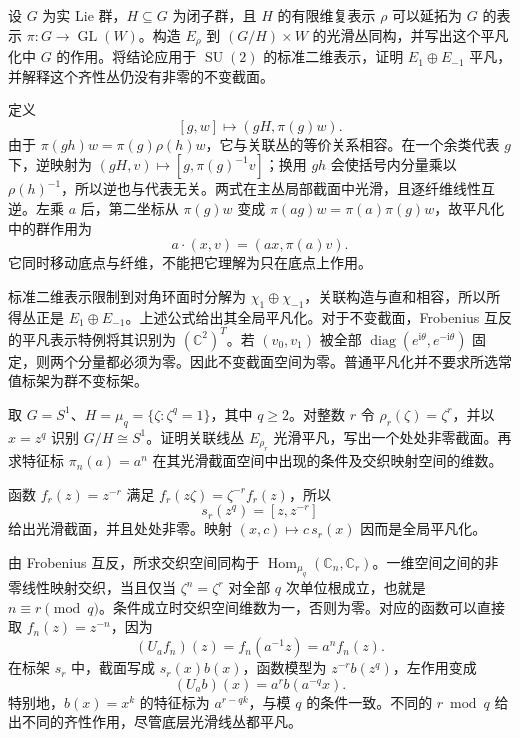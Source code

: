 \begin{exercise}\label{g1:ex:extendible-isotropy-trivial-bundle}
	设 \(G\) 为实 Lie 群，\(H\subseteq G\) 为闭子群，且 \(H\) 的有限维复表示 \(\rho\) 可以延拓为 \(G\) 的表示 \(\pi:G\to\operatorname{GL}(W)\)。构造 \(E_\rho\) 到 \((G/H)\times W\) 的光滑丛同构，并写出这个平凡化中 \(G\) 的作用。将结论应用于 \(\operatorname{SU}(2)\) 的标准二维表示，证明 \(E_1\oplus E_{-1}\) 平凡，并解释这个齐性丛仍没有非零的不变截面。
\end{exercise}
\begin{solution}
	定义
	\[
		[g,w]\longmapsto(gH,\pi(g)w).
	\]
	由于 \(\pi(gh)w=\pi(g)\rho(h)w\)，它与关联丛的等价关系相容。在一个余类代表 \(g\) 下，逆映射为 \((gH,v)\mapsto[g,\pi(g)^{-1}v]\)；换用 \(gh\) 会使括号内分量乘以 \(\rho(h)^{-1}\)，所以逆也与代表无关。两式在主丛局部截面中光滑，且逐纤维线性互逆。左乘 \(a\) 后，第二坐标从 \(\pi(g)w\) 变成 \(\pi(ag)w=\pi(a)\pi(g)w\)，故平凡化中的群作用为
	\[
		a\cdot(x,v)=(ax,\pi(a)v).
	\]
	它同时移动底点与纤维，不能把它理解为只在底点上作用。

	标准二维表示限制到对角环面时分解为 \(\chi_1\oplus\chi_{-1}\)，关联构造与直和相容，所以所得丛正是 \(E_1\oplus E_{-1}\)。上述公式给出其全局平凡化。对于不变截面，Frobenius 互反的平凡表示特例将其识别为 \((\mathbb C^2)^T\)。若 \((v_0,v_1)\) 被全部 \(\operatorname{diag}(e^{\mathrm{i}\theta},e^{-\mathrm{i}\theta})\) 固定，则两个分量都必须为零。因此不变截面空间为零。普通平凡化并不要求所选常值标架为群不变标架。
\end{solution}

\begin{exercise}\label{g1:ex:circle-finite-isotropy-sections}
	取 \(G=S^1\)、\(H=\mu_q=\{\zeta:\zeta^q=1\}\)，其中 \(q\ge2\)。对整数 \(r\) 令 \(\rho_r(\zeta)=\zeta^r\)，并以 \(x=z^q\) 识别 \(G/H\cong S^1\)。证明关联线丛 \(E_{\rho_r}\) 光滑平凡，写出一个处处非零截面。再求特征标 \(\pi_n(a)=a^n\) 在其光滑截面空间中出现的条件及交织映射空间的维数。
\end{exercise}
\begin{solution}
	函数 \(f_r(z)=z^{-r}\) 满足 \(f_r(z\zeta)=\zeta^{-r}f_r(z)\)，所以
	\[
		s_r(z^q)=[z,z^{-r}]
	\]
	给出光滑截面，并且处处非零。映射 \((x,c)\mapsto c\,s_r(x)\) 因而是全局平凡化。

	由 Frobenius 互反，所求交织空间同构于 \(\operatorname{Hom}_{\mu_q}(\mathbb C_n,\mathbb C_r)\)。一维空间之间的非零线性映射交织，当且仅当 \(\zeta^n=\zeta^r\) 对全部 \(q\) 次单位根成立，也就是 \(n\equiv r\pmod q\)。条件成立时交织空间维数为一，否则为零。对应的函数可以直接取 \(f_n(z)=z^{-n}\)，因为
	\[
		(U_af_n)(z)=f_n(a^{-1}z)=a^n f_n(z).
	\]
	在标架 \(s_r\) 中，截面写成 \(s_r(x)b(x)\)，函数模型为 \(z^{-r}b(z^q)\)，左作用变成
	\[
		(U_ab)(x)=a^r b(a^{-q}x).
	\]
	特别地，\(b(x)=x^k\) 的特征标为 \(a^{r-qk}\)，与模 \(q\) 的条件一致。不同的 \(r\bmod q\) 给出不同的齐性作用，尽管底层光滑线丛都平凡。
\end{solution}

